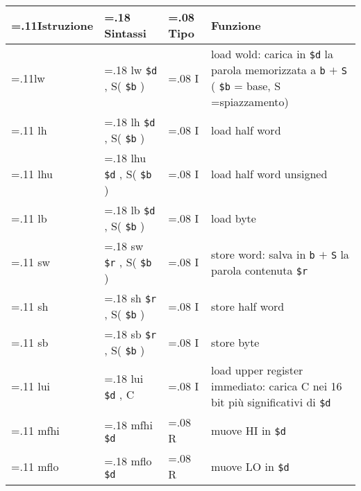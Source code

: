 \documentclass{standalone}
\newcommand\lightrule{%
	\arrayrulecolor{black!30}%
	\midrule[\lightrulewidth]%
	\arrayrulecolor{black}}
\newcommand\register[1]{%
	\texttt{#1}%
}
\begin{document}
\begin{tabularx}{\textwidth}{ >{\hsize=.11\textwidth}X >{\hsize=.18\textwidth}X >{\hsize=.08\textwidth}X X }
	\toprule
		Istruzione & Sintassi & Tipo & Funzione \\
	\midrule
		lw & lw \register{\$d}, S(\register{\$b}) & I & load wold: carica in \register{\$d} la parola memorizzata a \register{b}\(+\)\register{S} (\register{\$b} = base, S =spiazzamento) \\\lightrule
		lh & lh \register{\$d}, S(\register{\$b}) & I & load half word \\\lightrule
		lhu & lhu \register{\$d}, S(\register{\$b}) & I & load half word unsigned \\\lightrule
		lb & lb \register{\$d}, S(\register{\$b}) & I & load byte \\\lightrule
		sw & sw \register{\$r}, S(\register{\$b}) & I & store word: salva in \register{b}\(+\)\register{S} la parola contenuta \register{\$r} \\\lightrule
		sh & sh \register{\$r}, S(\register{\$b}) & I & store half word \\\lightrule
		sb & sb \register{\$r}, S(\register{\$b}) & I & store byte \\\lightrule
		lui & lui \register{\$d}, C & I &  load upper register immediato: carica C nei 16 bit più significativi di \register{\$d} \\\lightrule
		mfhi & mfhi \register{\$d} & R & muove HI in \register{\$d} \\\lightrule
		mflo & mflo \register{\$d} & R & muove LO in \register{\$d} \\
	\bottomrule
\end{tabularx}
\end{document}
